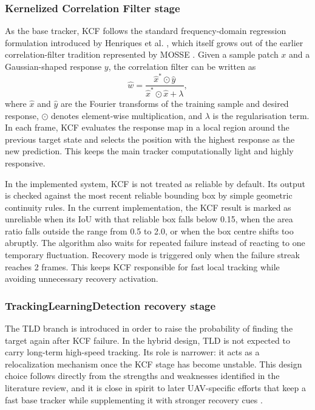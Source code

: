 \documentclass[12pt,a4paper]{article}
\begin{document}
\subsubsection{Kernelized Correlation Filter stage}
As the base tracker, KCF follows the standard frequency-domain regression formulation introduced by Henriques et al. \cite{henriques2015kcf}, which itself grows out of the earlier correlation-filter tradition represented by MOSSE \cite{bolme2010mosse}. Given a sample patch $x$ and a Gaussian-shaped response $y$, the correlation filter can be written as
\[
\hat{w} = \frac{\hat{x}^{\ast} \odot \hat{y}}{\hat{x}^{\ast} \odot \hat{x} + \lambda},
\]
where $\hat{x}$ and $\hat{y}$ are the Fourier transforms of the training sample and desired response, $\odot$ denotes element-wise multiplication, and $\lambda$ is the regularisation term. In each frame, KCF evaluates the response map in a local region around the previous target state and selects the position with the highest response as the new prediction. This keeps the main tracker computationally light and highly responsive.

In the implemented system, KCF is not treated as reliable by default. Its output is checked against the most recent reliable bounding box by simple geometric continuity rules. In the current implementation, the KCF result is marked as unreliable when its IoU with that reliable box falls below 0.15, when the area ratio falls outside the range from 0.5 to 2.0, or when the box centre shifts too abruptly. The algorithm also waits for repeated failure instead of reacting to one temporary fluctuation. Recovery mode is triggered only when the failure streak reaches 2 frames. This keeps KCF responsible for fast local tracking while avoiding unnecessary recovery activation.

\subsubsection{Tracking\textendash Learning\textendash Detection recovery stage}
The TLD branch is introduced in order to raise the probability of finding the target again after KCF failure. In the hybrid design, TLD is not expected to carry long-term high-speed tracking. Its role is narrower: it acts as a relocalization mechanism once the KCF stage has become unstable. This design choice follows directly from the strengths and weaknesses identified in the literature review, and it is close in spirit to later UAV-specific efforts that keep a fast base tracker while supplementing it with stronger recovery cues \cite{fan2022uav}.
\end{document}

